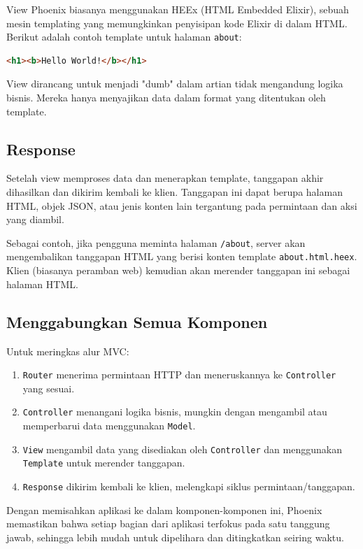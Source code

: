 View Phoenix biasanya menggunakan HEEx (HTML Embedded Elixir), sebuah mesin templating yang memungkinkan penyisipan kode Elixir di dalam HTML. Berikut adalah contoh template untuk halaman \texttt{about}:

\begin{lstlisting}[language=html]
	<h1><b>Hello World!</b></h1>
\end{lstlisting}

View dirancang untuk menjadi "dumb" dalam artian tidak mengandung logika bisnis. Mereka hanya menyajikan data dalam format yang ditentukan oleh template.

\subsection{Response}
Setelah view memproses data dan menerapkan template, tanggapan akhir dihasilkan dan dikirim kembali ke klien. Tanggapan ini dapat berupa halaman HTML, objek JSON, atau jenis konten lain tergantung pada permintaan dan aksi yang diambil.

Sebagai contoh, jika pengguna meminta halaman \texttt{/about}, server akan mengembalikan tanggapan HTML yang berisi konten template \texttt{about.html.heex}. Klien (biasanya peramban web) kemudian akan merender tanggapan ini sebagai halaman HTML.

\subsection{Menggabungkan Semua Komponen}
Untuk meringkas alur MVC:
\begin{enumerate}
	\item \texttt{Router} menerima permintaan HTTP dan meneruskannya ke \texttt{Controller} yang sesuai.
	\item \texttt{Controller} menangani logika bisnis, mungkin dengan mengambil atau memperbarui data menggunakan \texttt{Model}.
	\item \texttt{View} mengambil data yang disediakan oleh \texttt{Controller} dan menggunakan \texttt{Template} untuk merender tanggapan.
	\item \texttt{Response} dikirim kembali ke klien, melengkapi siklus permintaan/tanggapan.
\end{enumerate}

Dengan memisahkan aplikasi ke dalam komponen-komponen ini, Phoenix memastikan bahwa setiap bagian dari aplikasi terfokus pada satu tanggung jawab, sehingga lebih mudah untuk dipelihara dan ditingkatkan seiring waktu.


